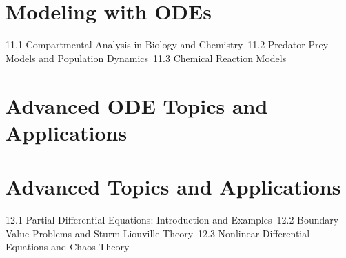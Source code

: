 \section{Modeling with ODEs}
11.1 Compartmental Analysis in Biology and Chemistry\
11.2 Predator-Prey Models and Population Dynamics\
11.3 Chemical Reaction Models\
\section{Advanced ODE Topics and Applications}
\section{Advanced Topics and Applications}
12.1 Partial Differential Equations: Introduction and Examples\
12.2 Boundary Value Problems and Sturm-Liouville Theory\
12.3 Nonlinear Differential Equations and Chaos Theory\
